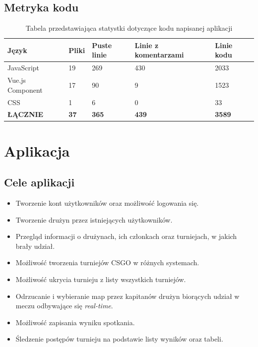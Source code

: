 \documentclass[shortabstract]{iithesis}
\theoremstyle{definition} \newtheorem{definition}{Definicja}[]
\theoremstyle{remark} \newtheorem{remark}[definition]{Observation}
\theoremstyle{plain} \newtheorem{theorem}[definition]{Theorem}
\theoremstyle{plain} \newtheorem{lemma}[definition]{Lemma}
\begin{document}
\section{Metryka kodu}
\begin{table}[H]
    \begin{tabular}{|l|l|l|l|l|}
    \hline
    \textbf{Język}   & \textbf{Pliki} & \textbf{Puste linie} & \textbf{Linie z komentarzami} & \textbf{Linie kodu} \\ \hline
    JavaScript       & 19             & 269                  & 430                           & 2033                \\ \hline
    Vue.js Component & 17             & 90                   & 9                             & 1523                \\ \hline
    CSS              & 1              & 6                    & 0                             & 33                  \\ \hline
    \textbf{ŁĄCZNIE} & \textbf{37}    & \textbf{365}         & \textbf{439}                  & \textbf{3589}       \\ \hline
    \end{tabular}
    \caption{\label{tab:code-lines}Tabela przedstawiająca statystki dotyczące kodu napisanej aplikacji}
\end{table}

\chapter{Aplikacja}
\section{Cele aplikacji}

\begin{itemize}
    \item Tworzenie kont użytkowników oraz możliwość logowania się.
    \item Tworzenie drużyn przez istniejących użytkowników.
    \item Przegląd informacji o drużynach, ich członkach oraz turniejach, w jakich brały udział.
    \item Możliwość tworzenia turniejów CSGO w różnych systemach.
    \item Możliwość ukrycia turnieju z listy wszystkich turniejów.
    \item Odrzucanie i wybieranie map przez kapitanów drużyn biorących udział w meczu odbywające się \textit{real-time}.
    \item Możliwość zapisania wyniku spotkania.
    \item Śledzenie postępów turnieju na podstawie listy wyników oraz tabeli.
\end{itemize}
\end{document}
